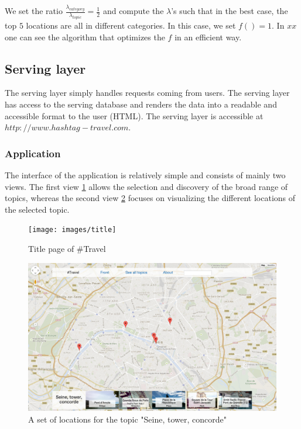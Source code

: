 We set the ratio $\frac{\lambda_{category}}{\lambda_{topic}} = \frac{1}{2}$ and compute the $\lambda$'s such that in the best case, the top $5$ locations are all in different categories. In this case, we set $f() = 1$. In $xx$ one can see the algorithm that optimizes the $f$ in an efficient way.

\subsection{Serving layer}

The serving layer simply handles requests coming from users. The serving layer has access to the serving database and renders the data into a readable and accessible format to the user (HTML). The serving layer is accessible at $http://www.hashtag-travel.com$.

\subsubsection{Application}

The interface of the application is relatively simple and consists of mainly two views. The first view \ref{fig:title} allows the selection and discovery of the broad range of topics, whereas the second view \ref{fig:map} focuses on visualizing the different locations of the selected topic.

\begin{figure}[h!]
  \centering
    \texttt{[image: images/title]}
  \caption{Title page of \#Travel}
  \label{fig:title}
\end{figure}

\begin{figure}[h!]
  \centering
    \includegraphics[width=1\textwidth]{images/map}
  \caption{A set of locations for the topic "Seine, tower, concorde"}
  \label{fig:map}
\end{figure}

